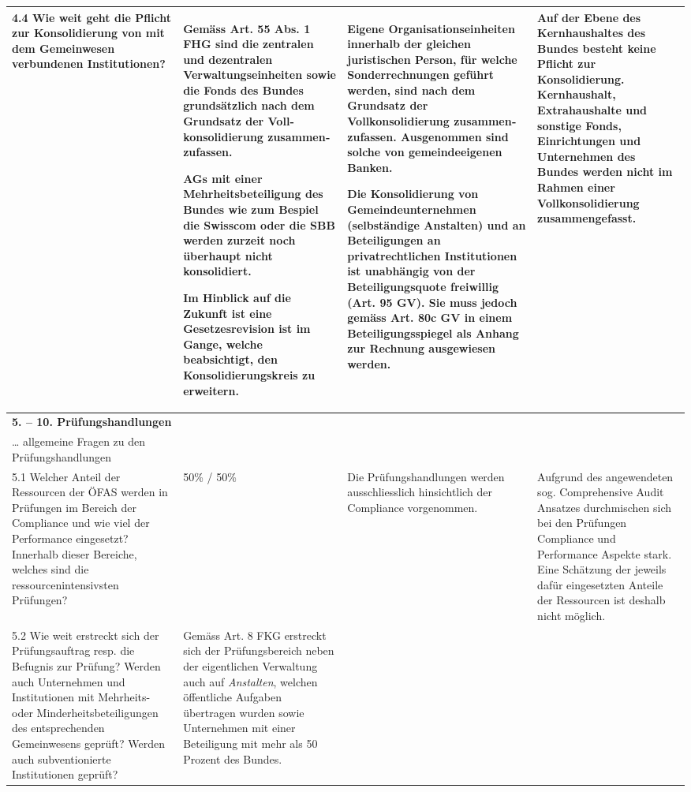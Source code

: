 \documentclass[10pt]{article}
\begin{document}
\begin{landscape}
\begin{center}
\begin{longtable}{|p{4cm}|p{5cm}|p{7.5cm}|p{7.5cm}|}
 \\
\hline
4.4 Wie weit geht die Pflicht zur Konsolidierung von mit dem Gemeinwesen verbundenen Institutionen? & Gemäss Art. 55 Abs. 1 FHG sind die zentralen und dezentralen Verwaltungseinheiten sowie die Fonds des Bundes grundsätzlich nach dem Grundsatz der Voll­konsolidierung zusammen­zu­fassen.

AGs mit einer Mehrheitsbeteiligung des Bundes wie zum Bespiel die Swisscom oder die SBB werden zurzeit noch überhaupt nicht konsolidiert.

Im Hinblick auf die Zukunft ist eine Gesetzesrevision ist im Gange, welche beabsichtigt, den Konsolidierungskreis zu erweitern.

 & Eigene Organisationseinheiten innerhalb der gleichen juristischen Person, für welche Sonderrechnungen geführt werden, sind nach dem Grundsatz der Vollkonsolidierung zusammen­zufassen. Ausgenommen sind solche von gemeindeeigenen Banken.

Die Konsolidierung von Gemeinde­unternehmen (selbständige Anstalten) und an Beteiligungen an privatrechtlichen Institutionen ist unabhängig von der Beteiligungs­quote freiwillig (Art. 95 GV). Sie muss jedoch gemäss Art. 80c GV in einem Beteiligungsspiegel als Anhang zur Rechnung aus­ge­wiesen werden.

 & Auf der Ebene des Kernhaushaltes des Bundes besteht keine Pflicht zur Konsolidierung. Kernhaushalt, Extrahaushalte und sonstige Fonds, Einrichtungen und Unter­nehmen des Bundes werden nicht im Rahmen einer Vollkonsolidie­rung zusammengefasst. \\
\hline
\textbf{5. -- 10. Prüfungshandlungen} &  &  &  \\
\hline
… allgemeine Fragen zu den Prüfungshandlungen &  &  &  \\
\hline
5.1 Welcher Anteil der Ressourcen der ÖFAS werden in Prüfungen im Bereich der Compliance und wie viel der Performance eingesetzt? Innerhalb dieser Bereiche, welches sind die ressourcenintensivsten Prüfungen? & 50\% / 50\% & Die Prüfungshandlungen werden ausschliesslich hinsichtlich der Compliance vorgenommen. & Aufgrund des angewendeten sog. Comprehensive Audit Ansatzes durchmischen sich bei den Prüfungen Compliance und Performance Aspekte stark. Eine Schätzung der jeweils dafür eingesetzten Anteile der Ressourcen ist deshalb nicht möglich. \\
\hline
5.2 Wie weit erstreckt sich der Prüfungsauftrag resp. die Befugnis zur Prüfung? Werden auch Unternehmen und Institutionen mit Mehrheits- oder Minderheitsbeteiligungen des entsprechenden Gemeinwesens geprüft? Werden auch subventionierte Institutionen geprüft? & Gemäss Art. 8 FKG erstreckt sich der Prüfungsbereich neben der eigentlichen Verwaltung auch auf \textit{Anstalten}, welchen öffentliche Aufgaben übertragen wurden sowie Unternehmen mit einer Beteiligung mit mehr als 50 Prozent des Bundes.


\end{longtable}
\end{center}
\end{landscape}
\end{document}
